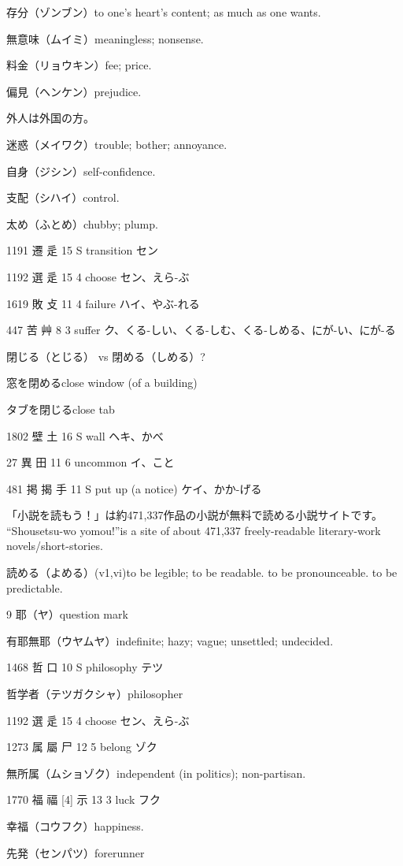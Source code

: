 存分（ゾンブン）to one's heart's content; as much as one wants.

無意味（ムイミ）meaningless; nonsense.

料金（リョウキン）fee; price.

偏見（ヘンケン）prejudice.

外人は外国の方。

迷惑（メイワク）trouble; bother; annoyance.

自身（ジシン）self-confidence.

支配（シハイ）control.

太め（ふとめ）chubby; plump.

1191	遷		辵	15	S		transition	セン

1192	選		辵	15	4		choose	セン、えら-ぶ

1619	敗		攴	11	4		failure	ハイ、やぶ-れる

447	苦		艸	8	3		suffer	ク、くる-しい、くる-しむ、くる-しめる、にが-い、にが-る

閉じる（とじる） vs 閉める（しめる）?

窓を閉めるclose window (of a building)

タブを閉じるclose tab

1802	壁		土	16	S		wall	ヘキ、かべ

27	異		田	11	6		uncommon	イ、こと

481	掲	揭	手	11	S		put up (a notice)	ケイ、かか-げる

「小説を読もう！」は約471,337作品の小説が無料で読める小説サイトです。
``Shousetsu-wo yomou!''is a site of about 471,337 freely-readable literary-work novels/short-stories.

読める（よめる）(v1,vi)to be legible; to be readable.
to be pronounceable.
to be predictable.

9 耶（ヤ）question mark

有耶無耶（ウヤムヤ）indefinite; hazy; vague; unsettled; undecided.

1468	哲		口	10	S		philosophy	テツ

哲学者（テツガクシャ）philosopher

1192	選		辵	15	4		choose	セン、えら-ぶ

1273	属	屬	尸	12	5		belong	ゾク

無所属（ムショゾク）independent (in politics); non-partisan.

1770	福	福 [4]	示	13	3		luck	フク

幸福（コウフク）happiness.

先発（センパツ）forerunner

